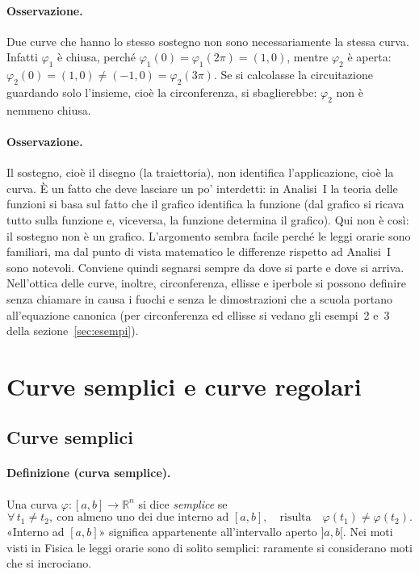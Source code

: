 \paragraph{Osservazione.} Due curve che hanno lo stesso sostegno non sono necessariamente
la stessa curva. Infatti $\varphi_1$ è chiusa, perché $\varphi_1(0)=\varphi_1(2\pi)=(1,0)$,
mentre $\varphi_2$ è aperta: $\varphi_2(0)=(1,0)\neq(-1,0)=\varphi_2(3\pi)$.
Se si calcolasse la circuitazione guardando solo l'insieme, cioè la circonferenza, si
sbaglierebbe: $\varphi_2$ non è nemmeno chiusa.

\paragraph{Osservazione.} Il sostegno, cioè il disegno (la traiettoria), non identifica
l'applicazione, cioè la curva.
È un fatto che deve lasciare un po' interdetti: in Analisi~I la teoria delle funzioni si
basa sul fatto che il grafico identifica la funzione (dal grafico si ricava tutto sulla
funzione e, viceversa, la funzione determina il grafico). Qui non è così: il sostegno
non è un grafico. L'argomento sembra facile perché le leggi orarie sono familiari, ma
dal punto di vista matematico le differenze rispetto ad Analisi~I sono notevoli.
Conviene quindi segnarsi sempre da dove si parte e dove si arriva. Nell'ottica delle
curve, inoltre, circonferenza, ellisse e iperbole si possono definire senza chiamare in
causa i fuochi e senza le dimostrazioni che a scuola portano all'equazione canonica (per
circonferenza ed ellisse si vedano gli esempi~2 e~3 della sezione~\ref{sec:esempi}).

\section{Curve semplici e curve regolari}

\subsection{Curve semplici}

\paragraph{Definizione (curva semplice).} Una curva $\varphi\colon[a,b]\to\mathbb{R}^n$ si
dice \emph{semplice} se
\[
\forall\,t_1\neq t_2,\ \text{con almeno uno dei due interno ad }[a,b],\quad
\text{risulta}\quad \varphi(t_1)\neq\varphi(t_2).
\]
«Interno ad $[a,b]$» significa appartenente all'intervallo aperto $]a,b[$.
Nei moti visti in Fisica le leggi orarie sono di solito semplici: raramente si
considerano moti che si incrociano.

